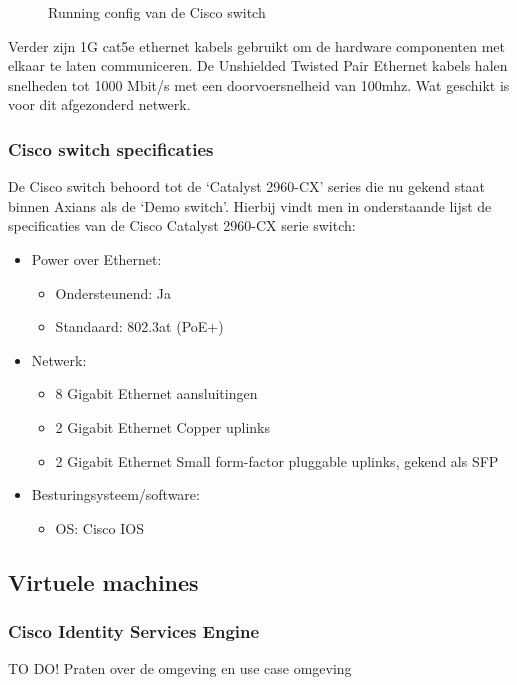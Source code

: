 \begin{figure}[H]
	\centering
	\qquad
	\qquad
	\caption{Running config van de Cisco switch}%
	\label{fig:RunningConfig}%
\end{figure}
Verder zijn 1G cat5e ethernet kabels gebruikt om de hardware componenten met elkaar te laten communiceren. De Unshielded Twisted Pair Ethernet kabels halen snelheden tot 1000 Mbit/s met een doorvoersnelheid van 100mhz. Wat geschikt is voor dit afgezonderd netwerk.

\subsubsection{Cisco switch specificaties}
De Cisco switch behoord tot de ‘Catalyst 2960-CX’ series die nu gekend staat binnen Axians als de ‘Demo switch’. Hierbij vindt men in onderstaande lijst de specificaties van de Cisco Catalyst 2960-CX serie switch:

\begin{itemize}
	\item Power over Ethernet:
	\begin{itemize}
		\item Ondersteunend: Ja
		\item Standaard: 802.3at (PoE+)
	\end{itemize}
	\item Netwerk:
	\begin{itemize}
		\item 8 Gigabit Ethernet aansluitingen
		\item 2 Gigabit Ethernet Copper uplinks
		\item 2 Gigabit Ethernet Small form-factor pluggable uplinks, gekend als SFP
	\end{itemize}
	\item Besturingsysteem/software:
	\begin{itemize}
		\item OS: Cisco IOS
    \end{itemize}
\end{itemize}


\subsection{Virtuele machines}
\subsubsection{Cisco Identity Services Engine}
 TO DO! Praten over de omgeving en use case omgeving 
\newline
\newline

